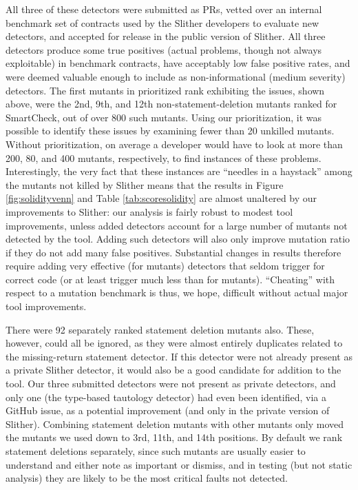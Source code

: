 All three of these detectors were submitted as PRs, vetted over an internal benchmark set of contracts used by the Slither developers to evaluate new detectors, and accepted for release in the public version of Slither.  All three detectors produce some true positives (actual problems, though not always exploitable) in benchmark contracts, have acceptably low false positive rates, and were deemed valuable enough to include as non-informational (medium severity) detectors.  The first mutants in prioritized rank exhibiting the issues, shown above, were the 2nd, 9th, and 12th non-statement-deletion mutants ranked for SmartCheck, out of over 800 such mutants.  Using our prioritization, it was possible to identify these issues by examining fewer than 20 unkilled mutants.  Without prioritization, on average a developer would have to look at more than 200, 80, and 400 mutants, respectively, to find instances of these problems.  Interestingly, the very fact that these instances are ``needles in a haystack'' among the mutants not killed by Slither means that the results in Figure \ref{fig:solidityvenn} and Table \ref{tab:scoresolidity} are almost unaltered by our improvements to Slither: our analysis is fairly robust to modest tool improvements, unless added detectors account for a large number of mutants not detected by the tool.  Adding such detectors will also only improve mutation ratio if they do not add many false positives.  Substantial changes in results therefore require adding very effective (for mutants) detectors that seldom trigger for correct code (or at least trigger much less than for mutants).  ``Cheating'' with respect to a mutation benchmark is thus, we hope, difficult without actual major tool improvements.

There were 92 separately ranked statement deletion mutants also.  These, however, could all be ignored, as they were almost entirely duplicates related to the missing-return statement detector.  If this detector were not already present as a private Slither detector, it would also be a good candidate for addition to the tool.  Our three submitted detectors were not present as private detectors, and only one (the type-based tautology detector) had even been identified, via a GitHub issue, as a potential improvement (and only in the private version of Slither).  Combining statement deletion mutants with other mutants only moved the mutants we used down to 3rd, 11th, and 14th positions.  By default we rank statement deletions separately, since such mutants are usually easier to understand and either note as important or dismiss, and in testing (but not static analysis) they are likely to be the most critical faults not detected.

